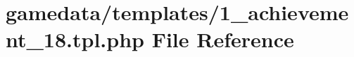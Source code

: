 \hypertarget{1__achievement__18_8tpl_8php}{\section{gamedata/templates/1\+\_\+achievement\+\_\+18.tpl.\+php File Reference}
\label{1__achievement__18_8tpl_8php}
}
